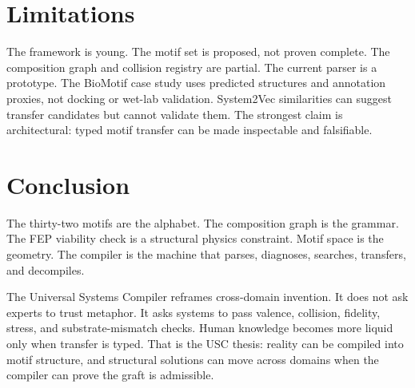 \documentclass[11pt]{article}
\begin{document}
\section{Limitations}

The framework is young. The motif set is proposed, not proven complete. The
composition graph and collision registry are partial. The current parser is a
prototype. The BioMotif case study uses predicted structures and annotation
proxies, not docking or wet-lab validation. System2Vec similarities can suggest
transfer candidates but cannot validate them. The strongest claim is
architectural: typed motif transfer can be made inspectable and falsifiable.

\section{Conclusion}

The thirty-two motifs are the alphabet. The composition graph is the grammar.
The FEP viability check is a structural physics constraint. Motif space is the
geometry. The compiler is the machine that parses, diagnoses, searches,
transfers, and decompiles.

The Universal Systems Compiler reframes cross-domain invention. It does not
ask experts to trust metaphor. It asks systems to pass valence, collision,
fidelity, stress, and substrate-mismatch checks. Human knowledge becomes more
liquid only when transfer is typed. That is the USC thesis: reality can be
compiled into motif structure, and structural solutions can move across domains
when the compiler can prove the graft is admissible.
\end{document}
